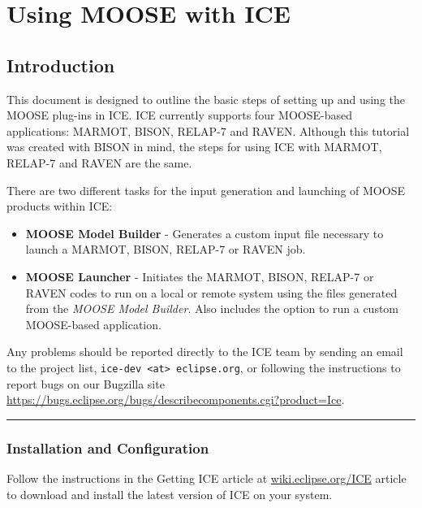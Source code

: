 \chapter{Using MOOSE with ICE}
\label{sec:usingMoose}
\section{Introduction}\label{introduction}

This document is designed to outline the basic steps of setting up and
using the MOOSE plug-ins in ICE. ICE currently supports four MOOSE-based
applications: MARMOT, BISON, RELAP-7 and RAVEN. Although this tutorial
was created with BISON in mind, the steps for using ICE with MARMOT,
RELAP-7 and RAVEN are the same.

There are two different tasks for the input generation and launching of
MOOSE products within ICE:

\begin{itemize}
\itemsep1pt\parskip0pt
\item
  \textbf{MOOSE Model Builder} - Generates a custom input file necessary
  to launch a MARMOT, BISON, RELAP-7 or RAVEN job.
\item
  \textbf{MOOSE Launcher} - Initiates the MARMOT, BISON, RELAP-7 or
  RAVEN codes to run on a local or remote system using the files
  generated from the \emph{MOOSE Model Builder}. Also includes the
  option to run a custom MOOSE-based application.
\end{itemize}

Any problems should be reported directly to the ICE team by sending an
email to the project list,
\texttt{ice-dev\ \textless{}at\textgreater{}\ eclipse.org}, or following
the instructions to report bugs on our Bugzilla site
\url{https://bugs.eclipse.org/bugs/describecomponents.cgi?product=Ice}.

\begin{center}\rule{0.5\linewidth}{\linethickness}\end{center}

\subsection{Installation and
Configuration}\label{installation-and-configuration}

Follow the instructions in the Getting ICE article at \url{wiki.eclipse.org/ICE} article
to download and install the latest version of ICE on your system.

